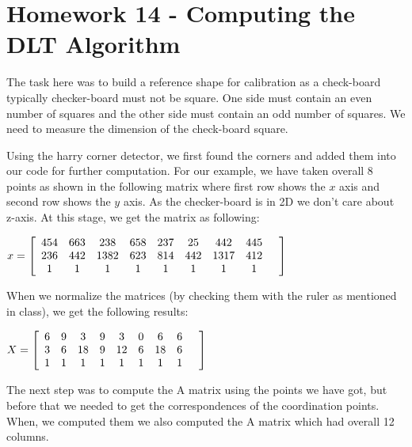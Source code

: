 \documentclass[]{article}
\begin{document}
\section{Homework 14 - Computing the DLT Algorithm}

The task here was to build a reference shape for calibration as a check-board typically checker-board must not be square. One side must contain an even number of squares and the other side must contain an odd number of squares. We need to measure the dimension of the check-board square. 

Using the harry corner detector, we first found the corners and added them into our code for further computation. For our example, we have taken overall 8 points as shown in the following matrix where first row shows the $x$ axis and second row shows the $y$ axis. As the checker-board is in 2D we don't care about z-axis. At this stage, we get the matrix as following: 

\vspace{0.5em}

\centerline {
	$ x =\left[ {\begin{array}{*{20}c}
		454 & 663 & 238 & 658 & 237 & 25 & 442 & 445 \\
		236 & 442 & 1382 & 623 & 814 & 442 & 1317 & 412 \\
		1 & 1 & 1 & 1 & 1 & 1 & 1 & 1 &  
		\end{array} } \right] $
}

\vspace{0.5em}

When we normalize the matrices (by checking them with the ruler as mentioned in class), we get the following results: 

\vspace{0.5em}

\centerline {
	$ X =\left[ {\begin{array}{*{20}c}
		6 & 9 & 3 & 9 & 3 & 0 & 6 & 6 \\
		3 & 6 & 18 & 9 & 12 & 6 & 18 & 6 \\
		1 & 1 & 1 & 1 & 1 & 1 & 1 & 1 &  
		\end{array} } \right] $
}

\vspace{0.5em}

The next step was to compute the A matrix using the points we have got, but before that we needed to get the correspondences of the coordination points. When, we computed them we also computed the A matrix which had overall 12 columns. 
\end{document}
